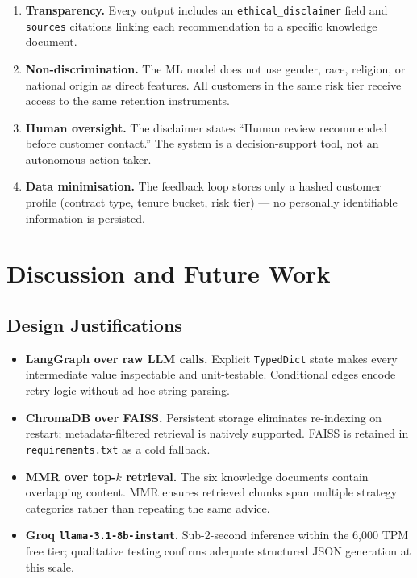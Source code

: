 \documentclass[11pt]{article}
\begin{document}
\begin{enumerate}
  \item \textbf{Transparency.} Every output includes an
        \texttt{ethical\_disclaimer} field and \texttt{sources} citations
        linking each recommendation to a specific knowledge document.
  \item \textbf{Non-discrimination.} The ML model does not use gender,
        race, religion, or national origin as direct features. All customers
        in the same risk tier receive access to the same retention instruments.
  \item \textbf{Human oversight.} The disclaimer states ``Human review
        recommended before customer contact.'' The system is a decision-support
        tool, not an autonomous action-taker.
  \item \textbf{Data minimisation.} The feedback loop stores only a hashed
        customer profile (contract type, tenure bucket, risk tier) --- no
        personally identifiable information is persisted.
\end{enumerate}

\section{Discussion and Future Work}
\label{sec:discussion}

\subsection{Design Justifications}

\begin{itemize}
  \item \textbf{LangGraph over raw LLM calls.} Explicit \texttt{TypedDict}
        state makes every intermediate value inspectable and unit-testable.
        Conditional edges encode retry logic without ad-hoc string parsing.
  \item \textbf{ChromaDB over FAISS.} Persistent storage eliminates
        re-indexing on restart; metadata-filtered retrieval is natively
        supported. FAISS is retained in \texttt{requirements.txt} as a
        cold fallback.
  \item \textbf{MMR over top-$k$ retrieval.} The six knowledge documents
        contain overlapping content. MMR ensures retrieved chunks span
        multiple strategy categories rather than repeating the same advice.
  \item \textbf{Groq \texttt{llama-3.1-8b-instant}.} Sub-2-second inference
        within the 6{,}000 TPM free tier; qualitative testing confirms
        adequate structured JSON generation at this scale.
\end{itemize}
\end{document}
